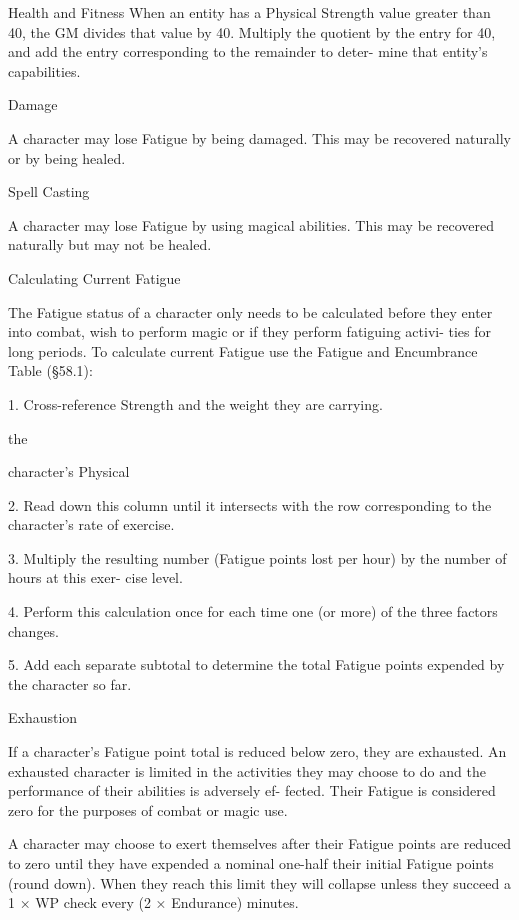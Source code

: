 \begin{Chapter}{Health and Fitness}
When  an  entity  has  a  Physical  Strength  value 
greater  than  40,  the  GM  divides  that  value  by  40. 
Multiply  the  quotient by  the  entry  for  40,  and  add 
the  entry  corresponding  to  the  remainder  to  deter-
mine that entity’s capabilities. 

Damage 

A  character  may  lose  Fatigue  by  being  damaged. 
This  may  be  recovered  naturally  or  by  being 
healed. 

Spell Casting 

A  character  may  lose  Fatigue  by  using  magical 
abilities. This may be recovered naturally but may 
not be healed. 

Calculating Current Fatigue 

The  Fatigue  status  of  a  character  only  needs  to  be 
calculated  before  they  enter  into  combat,  wish  to 
perform magic  or  if  they  perform  fatiguing  activi-
ties  for  long  periods.  To  calculate  current  Fatigue 
use the Fatigue and Encumbrance Table (§58.1): 

1.  Cross-reference 
Strength and the weight they are carrying. 

the 

character’s  Physical 

2.  Read  down  this  column  until  it  intersects  with 
the  row  corresponding  to  the  character’s  rate  of 
exercise. 

3.  Multiply  the  resulting  number  (Fatigue  points 
lost per hour) by the number of hours at this exer-
cise level. 

4.  Perform this  calculation  once  for each time  one 
(or more) of the three factors changes. 

5. Add each separate subtotal to determine the total 
Fatigue points expended by the character so far. 

Exhaustion 

If a character’s Fatigue point total is reduced below 
zero, they are exhausted. An exhausted character is 
limited in the activities they may choose to do and 
the  performance  of  their  abilities  is  adversely  ef-
fected.  Their  Fatigue  is  considered  zero  for  the 
purposes of combat or magic use. 

A  character  may  choose  to  exert  themselves  after 
their  Fatigue  points  are  reduced  to  zero  until  they 
have  expended  a  nominal  one-half  their  initial 
Fatigue points (round down). When they reach this 
limit  they  will  collapse  unless  they  succeed  a  1  × 
WP check every (2 × Endurance) minutes. 


\end{Chapter}
